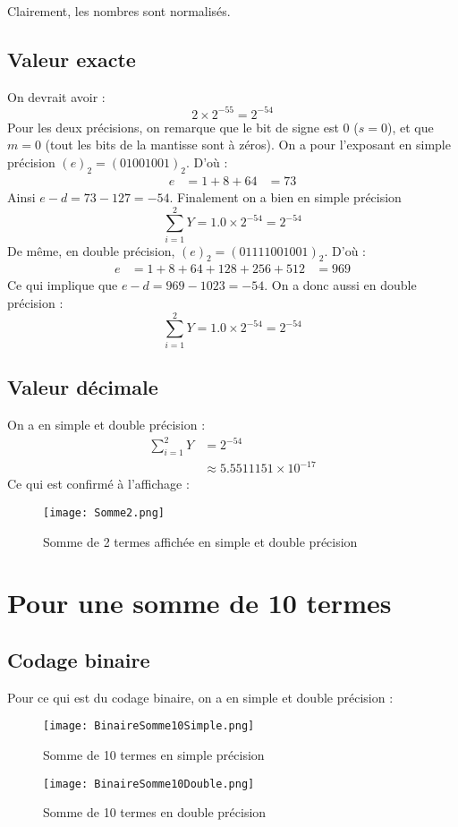 \documentclass[a4paper, titlepage]{livret} %
\begin{document}
				Clairement, les nombres sont normalisés.

			\subsection{Valeur exacte}
				On devrait avoir :
				\[
					2\times2^{-55} = 2^{-54} 
				\]
				Pour les deux précisions, on remarque que le bit de signe est $0$ ($s = 0$), et que $m = 0$ (tout les bits de la mantisse sont à zéros).
				On a pour l'exposant en simple précision $(e)_{2} = (01001001)_{2}$.
				D'où :
				\[\begin{aligned}
					e & = 1 + 8 + 64
					  & = 73
				\end{aligned}\]
				Ainsi $e - d = 73 - 127 = -54$.
				Finalement on a bien en simple précision
				\[
					\sum_{i=1}^{2} Y = 1.0\times2^{-54} = 2^{-54}
				\]
				De même, en double précision, $(e)_{2} = (01111001001)_{2}$.
				D'où :
				\[\begin{aligned}
					e & = 1 + 8 + 64 + 128 + 256 + 512
					  & = 969
				\end{aligned}\]
				Ce qui implique que $e - d = 969 - 1023 = -54$.
				On a donc aussi en double précision :
				\[
					\sum_{i=1}^{2} Y = 1.0\times2^{-54} = 2^{-54}
				\]

			\subsection{Valeur décimale}
				On a en simple et double précision :
				\[\begin{aligned}
					\sum_{i=1}^{2} Y & = 2^{-54}\\
									 & \approx 5.5511151\times10^{-17}
				\end{aligned}\]
				Ce qui est confirmé à l'affichage :
				\begin{figure}[!h]
					\centering
  						\texttt{[image: Somme2.png]}
  						\caption{Somme de 2 termes affichée en simple et double précision}
				\end{figure}

		\section{Pour une somme de 10 termes}
			\subsection{Codage binaire}
				Pour ce qui est du codage binaire, on a en simple et double précision :
				\begin{figure}[!h]
					\centering
  						\texttt{[image: BinaireSomme10Simple.png]}
  						\caption{Somme de 10 termes en simple précision}
				\end{figure}
				\begin{figure}[!h]
					\centering
  						\texttt{[image: BinaireSomme10Double.png]}
  						\caption{Somme de 10 termes en double précision}
				\end{figure}
\end{document}
